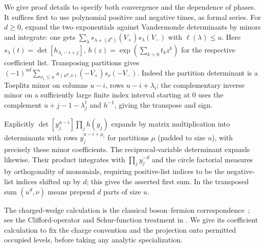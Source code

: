 We give proof details to specify both convergence and the dependence of phases. It suffices first to use polynomial positive and negative times, as formal series. For \(d\ge0\), expand the two exponentials against Vandermonde determinants by minors and integrate: one gets
\(\sum_\lambda s_{\lambda+(d^u)}(V_+)s_\lambda(V_-)\) with \(\ell(\lambda)\le u\). Here \(s_\lambda(t)=\det[h_{\lambda_i-i+j}]\), \(h(z)=\exp(\sum_{k>0}t_k z^k)\) for the respective coefficient list. Transposing partitions gives \((-1)^{ud}\sum_{\nu_1\le u}s_{(u^d,\nu)}(-V_+)s_\nu(-V_-)\). Indeed the partition determinant is a Toeplitz minor on columns \(u-i\), rows \(u-i+\lambda_i\); the complementary inverse minor on a sufficiently large finite index interval starting at 0 uses the complement \(u+j-1-\lambda^t_j\) and \(h^{-1}\), giving the transpose and sign.

Explicitly \(\det[y_j^{u-i}]\prod_j h(y_j)\) expands by matrix multiplication into determinants with rows \(y_j^{u-i+\mu_i}\) for partitions \(\mu\) (padded to size \(u\)), with precisely these minor coefficients. The reciprocal-variable determinant expands likewise. Their product integrates with \(\prod_j y_j^{-d}\) and the circle factorial measures by orthogonality of monomials, requiring positive-list indices to be the negative-list indices shifted up by \(d\); this gives the asserted first sum. In the transposed sum \((u^d,\nu)\) means prepend \(d\) parts of size \(u\).

The charged-wedge calculation is the classical boson--fermion correspondence~\cite{Frenkel1981}; see the Clifford-operator and Schur-function treatment in \cite[Theorems~8.1 and~8.3]{FrenkelJingWang2000}. We give its coefficient calculation to fix the charge convention and the projection onto permitted occupied levels, before taking any analytic specialization.

